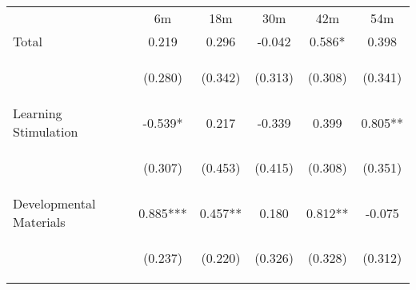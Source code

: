 \begin{tabular}{lccccc}
\hline \noalign{\smallskip} & 6m & 18m & 30m & 42m & 54m\\
\noalign{\smallskip}\hline \noalign{\smallskip}Total & 0.219 & 0.296 & -0.042 & 0.586* & 0.398\\
 & \begin{footnotesize}(0.280)\end{footnotesize} & \begin{footnotesize}(0.342)\end{footnotesize} & \begin{footnotesize}(0.313)\end{footnotesize} & \begin{footnotesize}(0.308)\end{footnotesize} & \begin{footnotesize}(0.341)\end{footnotesize}\\
\noalign{\smallskip}Learning Stimulation & -0.539* & 0.217 & -0.339 & 0.399 & 0.805**\\
 & \begin{footnotesize}(0.307)\end{footnotesize} & \begin{footnotesize}(0.453)\end{footnotesize} & \begin{footnotesize}(0.415)\end{footnotesize} & \begin{footnotesize}(0.308)\end{footnotesize} & \begin{footnotesize}(0.351)\end{footnotesize}\\
\noalign{\smallskip}Developmental Materials & 0.885*** & 0.457** & 0.180 & 0.812** & -0.075\\
 & \begin{footnotesize}(0.237)\end{footnotesize} & \begin{footnotesize}(0.220)\end{footnotesize} & \begin{footnotesize}(0.326)\end{footnotesize} & \begin{footnotesize}(0.328)\end{footnotesize} & \begin{footnotesize}(0.312)\end{footnotesize}\\

\end{tabular}
